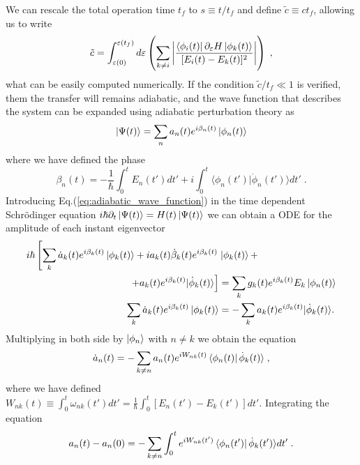 \documentclass[a4paper,11pt]{article}
\begin{document}
We can rescale the total operation time $t_f$ to $s\equiv t/t_f$ and define $\tilde{c}\equiv ct_f$, allowing us to write
\begin{equation}
	\tilde{c}=\int_{\varepsilon(0)}^{\varepsilon(t_f)}d\varepsilon\left(\sum _{k\neq i}\abs{\frac{\bra{\phi_i(t)}\partial_\varepsilon H\ket{\phi_k(t)}}{[E_i(t)-E_k(t)]^2}}\right)\; , 
	\label{eq:def_c_tilde}
\end{equation}
what can be easily computed numerically. If the condition $\tilde{c}/t_f\ll1$ is verified, them the transfer will remains adiabatic, and the wave function that describes the system can be expanded using adiabatic perturbation theory as
\begin{equation}
	\ket{\Psi(t)}=\sum_n a_n(t)e^{i\beta_n(t)}\ket{\phi_n(t)}
	\label{eq:adiabatic_wave_function}
\end{equation}
where we have defined the phase
\begin{equation}
	\beta_n(t)=-\frac{1}{\hbar}\int_0^tE_n(t')dt'+i\int_0^t\langle\phi_n(t')|\dot{\phi}_n(t')\rangle dt'\; .
\end{equation}
Introducing Eq.(\ref{eq:adiabatic_wave_function}) in the time dependent Schrödinger equation $i\hbar\partial_t\ket{\Psi(t)}=H(t)\ket{\Psi(t)}$ we can obtain a ODE for the amplitude of each instant eigenvector
\begin{equation}
	\begin{split}
	i\hbar\left[\sum_k \dot{a}_k(t)e^{i\beta_k(t)}\ket{\phi_k(t)}+ia_k(t)\dot{\beta}_k(t)e^{i\beta_k(t)}\right.&\ket{\phi_k(t)}+\\
	\left.+a_k(t)e^{i\beta_k(t)}|\dot{\phi}_k(t)\rangle\right] &= \sum_k g_k(t)e^{i\beta_k(t)}E_k\ket{\phi_n(t)}\\
	\sum_k\dot{a}_k(t)e^{i\beta_k(t)}\ket{\phi_k(t)}&=-\sum_k a_k(t)e^{i\beta_k(t)}|\dot{\phi}_k(t)\rangle.
	\end{split}
\end{equation}
Multiplying in both side by $\ket{\phi_n}$ with $n\neq k$ we obtain the equation
\begin{equation}
	\dot{a}_n(t)=-\sum_{k\neq n}a_n(t)e^{iW_{nk}(t)}\bra{\phi_n(t)}\dot{\phi}_k(t)\rangle\; ,
\end{equation}
where we have defined $W_{nk}(t)\equiv\int_0^t\omega_{nk}(t')dt'=\frac{1}{\hbar}\int_0^t[E_n(t')-E_k(t')]dt'$. Integrating the equation 
\begin{equation}
	a_n(t)-a_n(0)=-\sum_{k\neq n}\int_0^te^{iW_{nk}(t')}\bra{\phi_n(t')}\dot{\phi}_k(t')\rangle dt'\; .
\end{equation}
\end{document}
